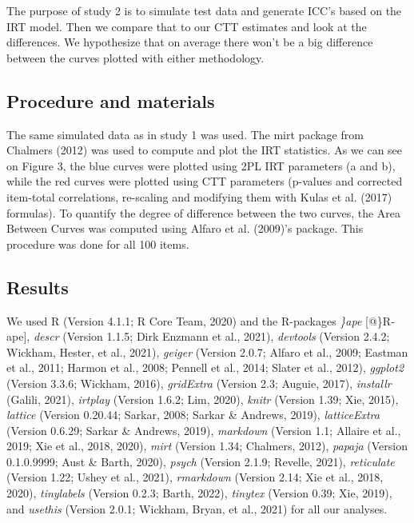 \documentclass[
  man]{apa6}
\begin{document}
The purpose of study 2 is to simulate test data and generate ICC's based on the IRT model. Then we compare that to our CTT estimates and look at the differences. We hypothesize that on average there won't be a big difference between the curves plotted with either methodology.

\hypertarget{procedure-and-materials}{%
\subsection{Procedure and materials}\label{procedure-and-materials}}

The same simulated data as in study 1 was used. The mirt package from Chalmers (2012) was used to compute and plot the IRT statistics. As we can see on Figure 3, the blue curves were plotted using 2PL IRT parameters (a and b), while the red curves were plotted using CTT parameters (p-values and corrected item-total correlations, re-scaling and modifying them with Kulas et al. (2017) formulas). To quantify the degree of difference between the two curves, the Area Between Curves was computed using Alfaro et al. (2009)'s package. This procedure was done for all 100 items.

\hypertarget{results-1}{%
\subsection{Results}\label{results-1}}

We used R (Version 4.1.1; R Core Team, 2020) and the R-packages \emph{\}ape} {[}@\}R-ape{]}, \emph{descr} (Version 1.1.5; Dirk Enzmann et al., 2021), \emph{devtools} (Version 2.4.2; Wickham, Hester, et al., 2021), \emph{geiger} (Version 2.0.7; Alfaro et al., 2009; Eastman et al., 2011; Harmon et al., 2008; Pennell et al., 2014; Slater et al., 2012), \emph{ggplot2} (Version 3.3.6; Wickham, 2016), \emph{gridExtra} (Version 2.3; Auguie, 2017), \emph{installr} (Galili, 2021), \emph{irtplay} (Version 1.6.2; Lim, 2020), \emph{knitr} (Version 1.39; Xie, 2015), \emph{lattice} (Version 0.20.44; Sarkar, 2008; Sarkar \& Andrews, 2019), \emph{latticeExtra} (Version 0.6.29; Sarkar \& Andrews, 2019), \emph{markdown} (Version 1.1; Allaire et al., 2019; Xie et al., 2018, 2020), \emph{mirt} (Version 1.34; Chalmers, 2012), \emph{papaja} (Version 0.1.0.9999; Aust \& Barth, 2020), \emph{psych} (Version 2.1.9; Revelle, 2021), \emph{reticulate} (Version 1.22; Ushey et al., 2021), \emph{rmarkdown} (Version 2.14; Xie et al., 2018, 2020), \emph{tinylabels} (Version 0.2.3; Barth, 2022), \emph{tinytex} (Version 0.39; Xie, 2019), and \emph{usethis} (Version 2.0.1; Wickham, Bryan, et al., 2021) for all our analyses.
\end{document}
